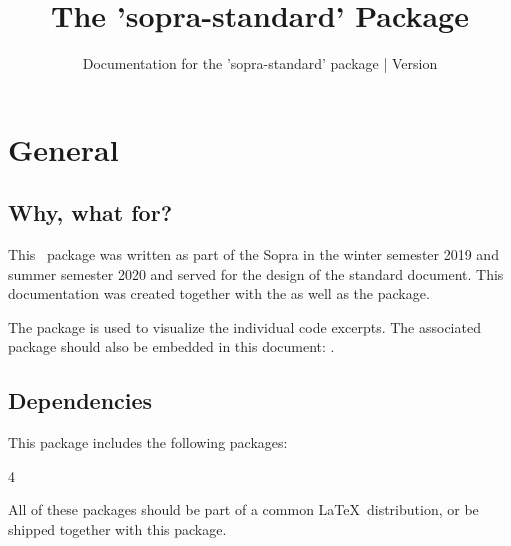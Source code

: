 \documentclass{sopra-base}
\title{The 'sopra-standard' Package}
\subtitle[Documentation for the 'sopra-standard' package]{Documentation for the 'sopra-standard' package | Version \thesosversion}
\begin{document}
    \maketitle

\section{General}
\subsection{Why, what for?}
    This \LaTeXe\ package was written as part of the Sopra in the
    winter semester 2019 and summer semester 2020 and served for the design of the standard document. This documentation was created together with the
     as well as the  package.\par
    The  package is used to visualize the individual code
    excerpts.
    The associated package should also be embedded in this document: .
\subsection{Dependencies}
    This package includes the following packages:
    \begin{multicols}{4}
    \end{multicols}
    All of these packages should be part of a common \LaTeX\ distribution, or be shipped together with this package.
\end{document}

